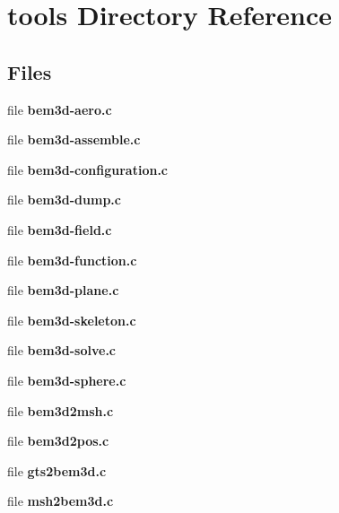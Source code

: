 \section{tools Directory Reference}
\label{dir_4eeb864c4eec08c7d6b9d3b0352cfdde}
\subsection*{Files}
\begin{DoxyCompactItemize}
\item 
file {\bfseries bem3d-\/aero.\+c}
\item 
file {\bfseries bem3d-\/assemble.\+c}
\item 
file {\bfseries bem3d-\/configuration.\+c}
\item 
file {\bfseries bem3d-\/dump.\+c}
\item 
file {\bfseries bem3d-\/field.\+c}
\item 
file {\bfseries bem3d-\/function.\+c}
\item 
file {\bfseries bem3d-\/plane.\+c}
\item 
file {\bfseries bem3d-\/skeleton.\+c}
\item 
file {\bfseries bem3d-\/solve.\+c}
\item 
file {\bfseries bem3d-\/sphere.\+c}
\item 
file {\bfseries bem3d2msh.\+c}
\item 
file {\bfseries bem3d2pos.\+c}
\item 
file {\bfseries gts2bem3d.\+c}
\item 
file {\bfseries msh2bem3d.\+c}
\end{DoxyCompactItemize}
